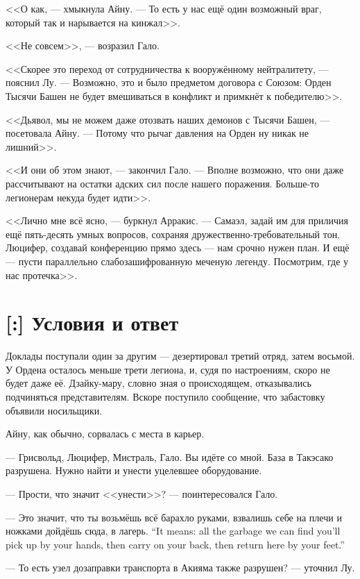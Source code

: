 <<О как, --- хмыкнула Айну.
--- То есть у нас ещё один возможный враг, который так и нарывается на кинжал>>.

<<Не совсем>>, --- возразил Гало.

<<Скорее это переход от сотрудничества к вооружённому нейтралитету, --- пояснил Лу.
--- Возможно, это и было предметом договора с Союзом: Орден Тысячи Башен не будет вмешиваться в конфликт и примкнёт к победителю>>.

<<Дьявол, мы не можем даже отозвать наших демонов с Тысячи Башен, --- посетовала Айну.
--- Потому что рычаг давления на Орден ну никак не лишний>>.

<<И они об этом знают, --- закончил Гало.
--- Вполне возможно, что они даже рассчитывают на остатки адских сил после нашего поражения.
Больше-то легионерам некуда будет идти>>.

<<Лично мне всё ясно, --- буркнул Арракис.
--- Самаэл, задай им для приличия ещё пять-десять умных вопросов, сохраняя дружественно-требовательный тон.
Люцифер, создавай конференцию прямо здесь --- нам срочно нужен план.
И ещё --- пусти параллельно слабозашифрованную меченую легенду.
Посмотрим, где у нас протечка>>.

\section{[:] Условия и ответ}

\textspace

Доклады поступали один за другим --- дезертировал третий отряд, затем восьмой.
У Ордена осталось меньше трети легиона, и, судя по настроениям, скоро не будет даже её.
Дзайку-мару, словно зная о происходящем, отказывались подчиняться представителям.
Вскоре поступило сообщение, что забастовку объявили носильщики.

Айну, как обычно, сорвалась с места в карьер.

--- Грисвольд, Люцифер, Мистраль, Гало.
Вы идёте со мной.
База в Такэсако разрушена.
Нужно найти и унести уцелевшее оборудование.

--- Прости, что значит <<унести>>? --- поинтересовался Гало.

{--- Это значит, что ты возьмёшь всё барахло руками, взвалишь себе на плечи и ножками дойдёшь сюда, в лагерь.}
{``It means: all the garbage we can find you'll pick up by your hands, then carry on your back, then return here by your feet.''}

--- То есть узел дозаправки транспорта в Акияма также разрушен? --- уточнил Лу.


